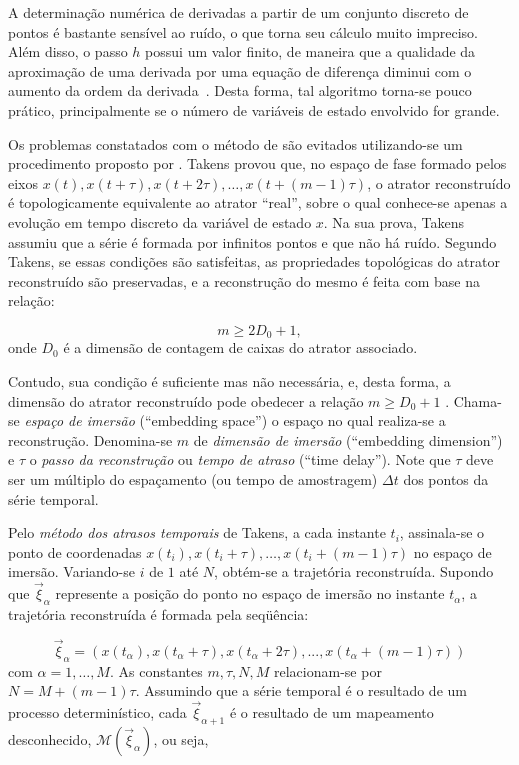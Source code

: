 A determinação numérica de derivadas a partir de um conjunto discreto de pontos é bastante sensível ao ruído, o que torna seu cálculo muito impreciso. Além disso, o passo $h$ possui um valor finito, de maneira que a qualidade da aproximação de uma derivada por uma equação de diferença diminui com o aumento da ordem da derivada~\cite{monteiro/02}. Desta forma, tal algoritmo torna-se pouco prático, principalmente se o número de variáveis de estado envolvido for grande.

Os problemas constatados com o método de  são evitados utilizando-se um procedimento proposto por . Takens provou que, no espaço de fase formado pelos eixos $x(t),x(t+\tau),x(t+2\tau),\ldots,x(t+(m-1)\tau)$, o atrator reconstruído é topologicamente equivalente ao atrator ``real'', sobre o qual conhece-se apenas a evolução em tempo discreto da variável de estado $x$. Na sua prova, Takens assumiu que a série é formada por infinitos pontos e que não há ruído. Segundo Takens, se essas condições são satisfeitas, as propriedades topológicas do atrator reconstruído são preservadas, e a reconstrução do mesmo é feita com base na relação:

\begin{equation}
m\geq 2D_{0}+1,
\label{eqconditak}
\end{equation}
onde $D_{0}$ é a dimensão de contagem de caixas do atrator associado.
 
Contudo, sua condição é suficiente mas não necessária, e, desta forma, a dimensão do atrator reconstruído pode obedecer a relação $m\geq D_{0}+1$ \cite{ding/93a}. Chama-se \textit{espaço de imersão} (``embedding space'') o espaço no qual realiza-se a reconstrução. Denomina-se $m$ de \textit{dimensão de imersão} (``embedding dimension'') e $\tau$ o \textit{passo da reconstrução} ou \textit{tempo de atraso} (``time delay''). Note que $\tau$ deve ser um múltiplo do espaçamento (ou tempo de amostragem) $\Delta t$ dos pontos da série temporal.

Pelo \textit{método dos atrasos temporais} de Takens, a cada instante $t_{i}$, assinala-se o ponto de coordenadas $x(t_{i}),x(t_{i}+\tau),\ldots,x(t_{i}+(m-1)\tau)$ no espaço de imersão. Variando-se $i$ de $1$ até $N$, obtém-se a trajetória reconstruída. Supondo que $\vec{\xi}_{\alpha}$ represente a posição do ponto no espaço de imersão no instante $t_{\alpha}$, a trajetória reconstruída é formada pela seqüência:

\begin{equation}
\vec{\xi}_{\alpha}=(x(t_{\alpha}),x(t_{\alpha}+\tau),x(t_{\alpha}+2\tau),...,x(t_{\alpha}+(m-1)\tau))
\label{eqtakensreconst}
\end{equation} 
com $\alpha=1,\ldots,M$. As constantes $m,\tau,N,M$ relacionam-se por $N=M+(m-1)\tau$. Assumindo que a série temporal é o resultado de um processo determinístico, cada $\vec{\xi}_{\alpha+1}$ é o resultado de um mapeamento desconhecido, $\mathcal M(\vec{\xi}_{\alpha})$, ou seja,


